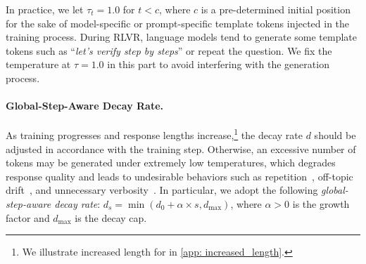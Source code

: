 %
In practice, we let $\tau_t = 1.0$ for $t<c$, where $c$ is a pre-determined initial position for the sake of model-specific or prompt-specific template tokens injected in the training process. 
%
During RLVR, language models tend to generate some template tokens such as ``\textit{let's verify step by steps}'' or repeat the question. 
%
%
We fix the temperature at $\tau = 1.0$ in this part to avoid interfering with the generation process.
%


\paragraph{Global-Step-Aware Decay Rate.}
As training progresses and response lengths increase,\footnote{We illustrate increased length for \alg in \cref{app: increased_length}. } the decay rate $d$ should be adjusted in accordance with the training step.
%
Otherwise, an excessive number of tokens may be generated under extremely low temperatures, which degrades response quality and leads to undesirable behaviors such as repetition~\citep{guo2025deepseek}, off-topic drift~\citep{spataru2024know}, and unnecessary verbosity~\citep{Holtzman2020The}. 
%
In particular, we adopt the following \emph{global-step-aware decay rate}:
$d_s = \min(d_0 + \alpha \times s, d_{\max})$, where $\alpha > 0$ is the growth factor and $d_{\max}$ is the decay cap. 



